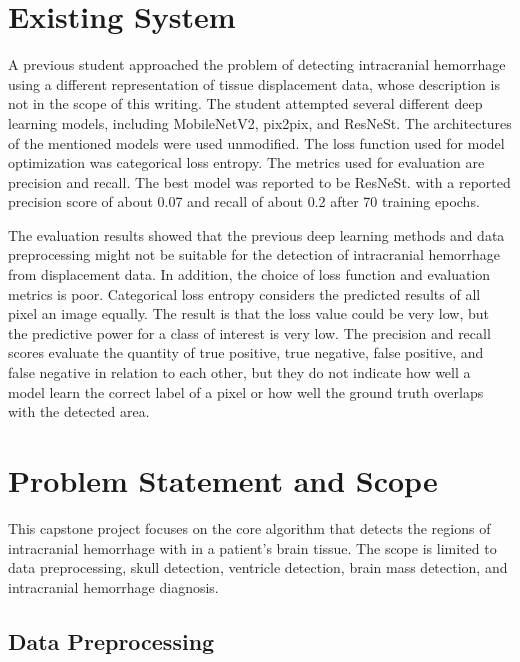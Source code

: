 \documentclass [11pt, proquest] {uwthesis}[2020/02/24]
\begin{document}
\section{Existing System}

A previous student approached the problem of detecting intracranial hemorrhage using a different representation of 
tissue displacement data, whose description is not in the scope of this writing. The student attempted several different 
deep learning models, including MobileNetV2\cite{sandler_mobilenetv2_2019}, pix2pix\cite{isola_image_image_2018}, 
and ResNeSt\cite{zhang_resnest_2020}. The architectures of the mentioned models were used unmodified. The loss function used for model 
optimization was categorical loss entropy. The metrics used for evaluation are precision and recall. The best model 
was reported to be ResNeSt. with a reported precision score of about 0.07 and recall of about 0.2 after 70 training epochs.

The evaluation results showed that the previous deep learning methods and data preprocessing might not be suitable for the 
detection of intracranial hemorrhage from displacement data. In addition, the choice of loss function and evaluation metrics 
is poor. Categorical loss entropy considers the predicted results of all pixel an image equally. The result is that the loss 
value could be very low, but the predictive power for a class of interest is very low. The precision and recall scores evaluate 
the quantity of true positive, true negative, false positive, and false negative in relation to each other, but they do not 
indicate how well a model learn the correct label of a pixel or how well the ground truth overlaps with the detected area.

\section{Problem Statement and Scope}
This capstone project focuses on the core algorithm that detects the regions of intracranial
hemorrhage with in a patient's brain tissue. The scope is limited to data preprocessing, skull detection,
ventricle detection, brain mass detection, and intracranial hemorrhage diagnosis.

\subsection{Data Preprocessing}
\end{document}
